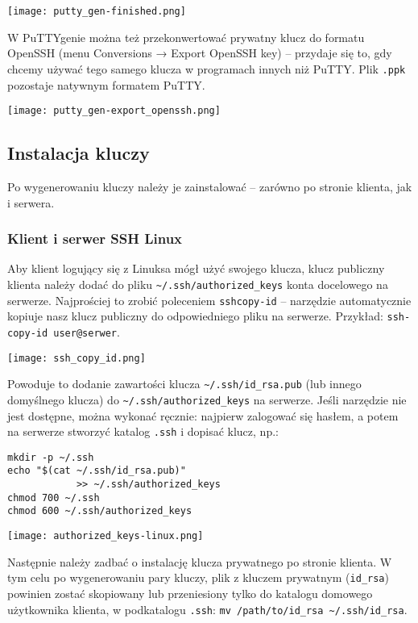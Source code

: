 \documentclass{article}
\begin{document}
\begin{multicols}{2}
\noindent
\texttt{[image: putty\_gen-finished.png]}

W PuTTYgenie można też przekonwertować prywatny klucz do formatu OpenSSH (menu Conversions →
Export OpenSSH key) -- przydaje się to, gdy chcemy używać tego samego klucza w programach innych niż
PuTTY. Plik \verb|.ppk| pozostaje natywnym formatem PuTTY. 

\noindent
\texttt{[image: putty\_gen-export\_openssh.png]}

\subsection{Instalacja kluczy}
Po wygenerowaniu kluczy należy je zainstalować -- zarówno po stronie klienta, jak i serwera.

\subsubsection{Klient i serwer SSH Linux}
Aby klient logujący się z Linuksa mógł użyć swojego klucza, klucz publiczny klienta należy dodać do pliku
\verb|~/.ssh/authorized_keys| konta docelowego na serwerze. Najprościej to zrobić poleceniem \verb|sshcopy-id| -- narzędzie automatycznie kopiuje nasz klucz publiczny do odpowiedniego pliku na serwerze. Przykład: \verb|ssh-copy-id user@serwer|.

\noindent
\texttt{[image: ssh\_copy\_id.png]}

Powoduje to dodanie zawartości klucza \verb|~/.ssh/id_rsa.pub| (lub innego domyślnego klucza) do \verb|~/.ssh/authorized_keys| na serwerze. Jeśli narzędzie nie jest dostępne, można wykonać ręcznie: najpierw zalogować się hasłem, a potem na serwerze stworzyć katalog \verb|.ssh| i dopisać klucz, np.: 
\begin{verbatim}
mkdir -p ~/.ssh
echo "$(cat ~/.ssh/id_rsa.pub)"
            >> ~/.ssh/authorized_keys
chmod 700 ~/.ssh
chmod 600 ~/.ssh/authorized_keys
\end{verbatim}

\noindent
\texttt{[image: authorized\_keys-linux.png]}

Następnie należy zadbać o instalację klucza prywatnego po stronie klienta. W tym celu po wygenerowaniu pary kluczy, plik z kluczem prywatnym (\verb|id_rsa|) powinien zostać skopiowany lub przeniesiony tylko do katalogu domowego użytkownika klienta, w podkatalogu \verb|.ssh|: \verb|mv /path/to/id_rsa ~/.ssh/id_rsa|.


\end{multicols}
\end{document}
